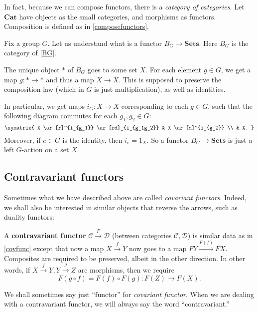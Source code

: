 \begin{example}\label{categoryofcats}
In fact, because we can compose functors, there is a \emph{category of
categories.} Let $\mathbf{Cat}$ have objects as the small categories, and
morphisms as functors. Composition is defined as in \cref{composefunctors}.
\end{example}


\begin{example} \label{groupact} Fix a group $G$. 
Let us understand what is a functor $B_G \stackrel{}{\to} \mathbf{Sets}$. Here $B_G$ is the
category  of \cref{BG}.

The unique object $\ast$ of $B_G$ goes to some set $X$. For each element $g \in G$, we
get a map $g: \ast \to \ast$ and thus a map $X \to X$. This is supposed to
preserve the composition law (which in $G$ is just multiplication), as well as
identities.

In particular, we get maps $i_G: X \to X$ corresponding to each $g \in G$, such
that the following diagram commutes for each $g_1, g_2 \in G$:
\[ \xymatrix{
X \ar[r]^{i_{g_1}} \ar[rd]_{i_{g_1g_2}} & X \ar[d]^{i_{g_2}} \\ & X.
}\]
Moreover, if $e \in G$ is the identity, then $i_e = 1_X$.
So a functor $B_G \to \mathbf{Sets}$ is just a left $G$-action on a set $X$.
\end{example}

\subsection{Contravariant functors}
Sometimes what we have described above are called \textit{covariant functors}.
Indeed, we shall also be interested in similar objects that reverse the
arrows, such as duality functors:

\begin{definition}
A \textbf{contravariant functor}  $\mathcal{C}
\stackrel{F}{\to}\mathcal{D}$ (between categories $\mathcal{C}, \mathcal{D}$)
is similar
data as in \cref{covfunc} except that now a map $X \stackrel{f}{\to} Y$ now goes to a map $FY
\stackrel{F(f)}{\to} FX$. Composites
are required to be preserved, albeit in the other direction.
In other words, if $X \stackrel{f}{\to} Y, Y \stackrel{g}{\to} Z$ are
morphisms, then we require
\[ F ( g \circ f) = F(f) \circ F(g): F(Z) \to F(X).  \]
\end{definition}

We shall sometimes  say just ``functor'' for \emph{covariant functor}. When we are
dealing with a contravariant functor, we will always say the word
``contravariant.''


